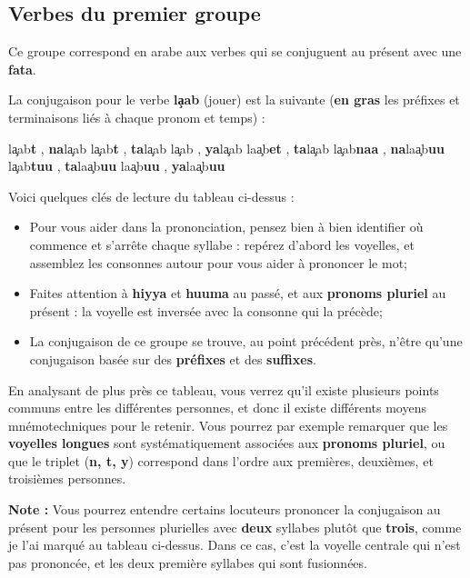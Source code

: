 \subsection{Verbes du premier groupe}
Ce groupe correspond en arabe aux verbes qui se conjuguent au présent avec une \textbf{fat\textcrh a}.

La conjugaison pour le verbe \textbf{l\c{a}ab} (jouer) est la suivante (\textbf{en gras} les préfixes et terminaisons liés à chaque pronom et temps) :

    {l\c{a}ab\textbf{t} , \textbf{na}l\c{a}ab}
    {l\c{a}ab\textbf{t} , \textbf{ta}l\c{a}ab} 
    {l\c{a}ab , \textbf{ya}l\c{a}ab}
    {la\c{a}b\textbf{et} , \textbf{ta}l\c{a}ab}
    {l\c{a}ab\textbf{naa} , \textbf{na}la\c{a}b\textbf{uu}}
    {l\c{a}ab\textbf{tuu} , \textbf{ta}la\c{a}b\textbf{uu}} 
    {la\c{a}b\textbf{uu} , \textbf{ya}la\c{a}b\textbf{uu}} 

Voici quelques clés de lecture du tableau ci-dessus :

\begin{itemize}
    \item Pour vous aider dans la prononciation, pensez bien à bien identifier où commence et s'arrête chaque syllabe : repérez d'abord les voyelles, et assemblez les consonnes autour pour vous aider à prononcer le mot;
    \item Faites attention à \textbf{hiyya} et \textbf{huuma} au passé, et aux \textbf{pronoms pluriel} au présent : la voyelle est inversée avec la consonne qui la précède;
    \item La conjugaison de ce groupe se trouve, au point précédent près, n'être qu'une conjugaison basée sur des \textbf{préfixes} et des \textbf{suffixes}.
\end{itemize}

En analysant de plus près ce tableau, vous verrez qu'il existe plusieurs points communs entre les différentes personnes, et donc il existe différents moyens mnémotechniques pour le retenir. Vous pourrez par exemple remarquer que les \textbf{voyelles longues} sont systématiquement associées aux \textbf{pronoms pluriel}, ou que le triplet (\textbf{n, t, y}) correspond dans l'ordre aux premières, deuxièmes, et troisièmes personnes.

\textbf{Note :} Vous pourrez entendre certains locuteurs prononcer la conjugaison au présent pour les personnes plurielles avec \textbf{deux} syllabes plutôt que \textbf{trois}, comme je l'ai marqué au tableau ci-dessus. Dans ce cas, c'est la voyelle centrale qui n'est pas prononcée, et les deux première syllabes qui sont fusionnées.

